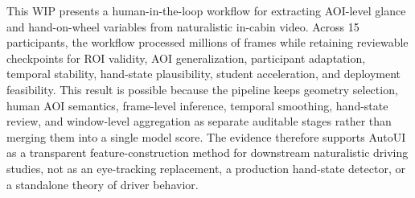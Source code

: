 \documentclass[sigconf,review,anonymous]{acmart}
\begin{document}
This WIP presents a human-in-the-loop workflow for extracting AOI-level
glance and hand-on-wheel variables from naturalistic in-cabin video.
Across 15 participants, the workflow processed millions of frames while
retaining reviewable checkpoints for ROI validity, AOI generalization,
participant adaptation, temporal stability, hand-state plausibility,
student acceleration, and deployment feasibility. This result is possible
because the pipeline keeps geometry selection, human AOI semantics,
frame-level inference, temporal smoothing, hand-state review, and
window-level aggregation as separate auditable stages rather than merging
them into a single model score. The evidence therefore supports AutoUI as
a transparent feature-construction method for downstream naturalistic
driving studies, not as an eye-tracking replacement, a production
hand-state detector, or a standalone theory of driver behavior.



\end{document}
